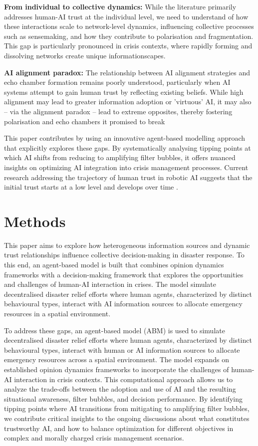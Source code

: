 \documentclass[pdflatex,sn-apa]{sn-jnl}%
\begin{document}
\textbf{From individual to collective dynamics: }While the literature primarily addresses human-AI trust at the individual level, we need to understand of how these interactions scale to network-level dynamics, influencing collective processes such as sensemaking, and how they contribute to polarisation and fragmentation. This gap is particularly pronounced in crisis contexts, where rapidly forming and dissolving networks create unique informationscapes.

\textbf{AI alignment paradox:} The relationship between AI alignment strategies and echo chamber formation remains poorly understood, particularly when AI systems attempt to gain human trust by reflecting existing beliefs. While high alignment may lead to greater information adoption or 'virtuous' AI, it may also -- via the alignment paradox \citep{west2025ai} -- lead to extreme opposites, thereby fostering polarisation and echo chambers it promised to break


 
This paper contributes by using an innovative agent-based modelling approach that explicitly explores these gaps. By systematically analysing tipping points at which AI shifts from reducing to amplifying filter bubbles, it offers nuanced insights on optimizing AI integration into crisis management processes.
Current research addressing the trajectory of human trust in robotic AI suggests that the 
initial trust starts at a low level and develops over time \citep{glikson2020human}.

\section{Methods}

This paper aims to explore how heterogeneous information sources and dynamic trust relationships influence collective decision-making in disaster response. To this end, an agent-based model is built that combines opinion dynamics frameworks with a decision-making framework that explores the opportunities and challenges of human-AI interaction in crises. The model simulate decentralised disaster relief efforts where human agents, characterized by distinct behavioural types, interact with AI information sources to allocate emergency resources in a spatial environment.

To address these gaps, an agent-based model (ABM) is used to simulate decentralised disaster relief efforts where human agents, characterized by distinct behavioural types, interact with human or AI information sources to allocate emergency resources across a spatial environment. The model expands on established opinion dynamics frameworks \citep{geschke2019triple} to incorporate the challenges of human-AI interaction in crisis contexts.
This computational approach allows us to analyze the trade-offs between the adoption and use of AI and the resulting situational awareness, filter bubbles, and decision performance. By identifying tipping points where AI transitions from mitigating to amplifying filter bubbles, we contribute critical insights to the ongoing discussions about what constitutes trustworthy AI, and how to balance optimization for different objectives in complex and morally charged crisis management scenarios.
\end{document}
